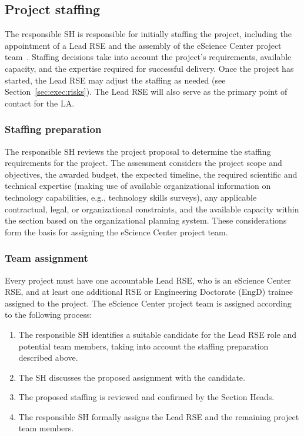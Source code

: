 \subsection{Project staffing}
\label{sec:init:staffing}
The responsible SH is responsible for initially staffing the project, including the appointment of a Lead RSE and the 
assembly of the eScience Center project team~\cite{rse-teams}. Staffing decisions take into account the project’s 
requirements, available capacity, and the expertise required for successful delivery.
Once the project has started, the Lead RSE may adjust the staffing as needed (see Section~\ref{sec:exec:risks}). The 
Lead RSE will also serve as the primary point of contact for the LA.

\subsubsection{Staffing preparation}
The responsible SH reviews the project proposal to determine the staffing requirements for the project. The assessment 
considers the project scope and objectives, the awarded budget, the expected timeline, the required scientific and 
technical expertise (making use of available organizational information on technology capabilities, e.g., technology 
skills surveys), any applicable contractual, legal, or organizational constraints, and the available capacity within the 
section based on the organizational planning system. These considerations form the basis for assigning the eScience 
Center project team.

\subsubsection{Team assignment}
Every project must have one accountable Lead RSE, who is an eScience Center RSE, and at least one additional RSE or 
Engineering Doctorate (EngD) trainee assigned to the project. The eScience Center project team is assigned according to 
the following process:
\begin{enumerate}
    \item The responsible SH identifies a suitable candidate for the Lead RSE role and potential team members, taking 
    into account the staffing preparation described above.
    \item The SH discusses the proposed assignment with the candidate.
    \item The proposed staffing is reviewed and confirmed by the Section Heads.
    \item The responsible SH formally assigns the Lead RSE and the remaining project team members.
\end{enumerate}

